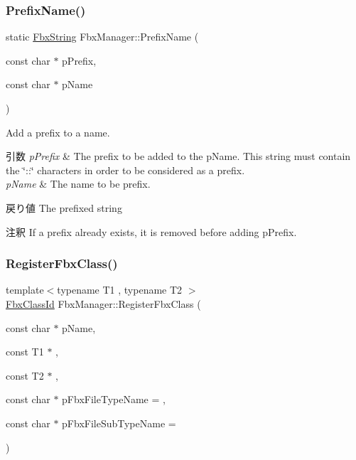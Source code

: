 \subsubsection{\texorpdfstring{Prefix\+Name()}{PrefixName()}}
{\footnotesize\ttfamily static \hyperlink{class_fbx_string}{Fbx\+String} Fbx\+Manager\+::\+Prefix\+Name (\begin{DoxyParamCaption}\item[{const char $\ast$}]{p\+Prefix,  }\item[{const char $\ast$}]{p\+Name }\end{DoxyParamCaption})\hspace{0.3cm}{\ttfamily [static]}}

Add a prefix to a name. 
\begin{DoxyParams}{引数}
{\em p\+Prefix} & The prefix to be added to the {\ttfamily p\+Name}. This string must contain the \char`\"{}\+::\char`\"{} characters in order to be considered as a prefix. \\
\hline
{\em p\+Name} & The name to be prefix. \\
\hline
\end{DoxyParams}
\begin{DoxyReturn}{戻り値}
The prefixed string 
\end{DoxyReturn}
\begin{DoxyRemark}{注釈}
If a prefix already exists, it is removed before adding {\ttfamily p\+Prefix}. 
\end{DoxyRemark}
\mbox{\label{class_fbx_manager_aa1caacb212a16e40652f98331fd94500}} 
\subsubsection{\texorpdfstring{Register\+Fbx\+Class()}{RegisterFbxClass()}}
{\footnotesize\ttfamily template$<$typename T1 , typename T2 $>$ \\
\hyperlink{class_fbx_class_id}{Fbx\+Class\+Id} Fbx\+Manager\+::\+Register\+Fbx\+Class (\begin{DoxyParamCaption}\item[{const char $\ast$}]{p\+Name,  }\item[{const T1 $\ast$}]{,  }\item[{const T2 $\ast$}]{,  }\item[{const char $\ast$}]{p\+Fbx\+File\+Type\+Name = {},  }\item[{const char $\ast$}]{p\+Fbx\+File\+Sub\+Type\+Name = {} }\end{DoxyParamCaption})}

